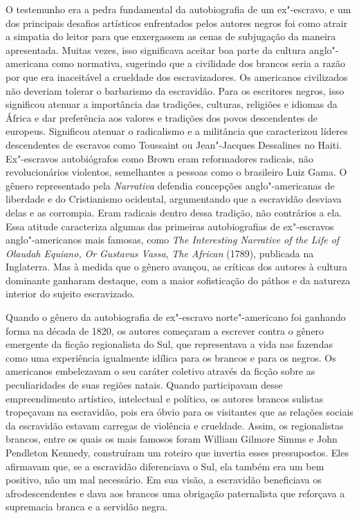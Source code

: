 O testemunho era a pedra fundamental da autobiografia de um ex"-escravo,
e um dos principais desafios artísticos enfrentados pelos autores negros
foi como atrair a simpatia do leitor para que enxergassem as cenas de
subjugação da maneira apresentada. Muitas vezes, isso significava
aceitar boa parte da cultura anglo"-americana como normativa, sugerindo
que a civilidade dos brancos seria a razão por que era inaceitável a
crueldade dos escravizadores. Os americanos civilizados não deveriam
tolerar o barbarismo da escravidão. Para os escritores negros, isso
significou atenuar a importância das tradições, culturas, religiões e
idiomas da África e dar preferência aos valores e tradições dos povos
descendentes de europeus. Significou atenuar o radicalismo e a
militância que caracterizou líderes descendentes de escravos como
Toussaint ou Jean"-Jacques Dessalines no Haiti. Ex"-escravos autobiógrafos
como Brown eram reformadores radicais, não revolucionários violentos,
semelhantes a pessoas como o brasileiro Luiz Gama. O gênero representado
pela \emph{Narrativa} defendia concepções anglo"-americanas de liberdade
e do Cristianismo ocidental, argumentando que a escravidão desviava
delas e as corrompia. Eram radicais dentro dessa tradição, não
contrários a ela. Essa atitude caracteriza algumas das primeiras
autobiografias de ex"-escravos anglo"-americanos mais famosas, como
\emph{The Interesting Narrative of the Life of Olaudah Equiano, Or}
\emph{Gustavus Vassa}, \emph{The African} (1789), publicada na
Inglaterra. Mas à medida que o gênero avançou, as críticas dos autores à
cultura dominante ganharam destaque, com a maior sofisticação do páthos
e da natureza interior do sujeito escravizado.

Quando o gênero da autobiografia de ex"-escravo norte"-americano foi
ganhando forma na década de 1820, os autores começaram a escrever contra
o gênero emergente da ficção regionalista do Sul, que representava a
vida nas fazendas como uma experiência igualmente idílica para os
brancos e para os negros. Os
americanos embelezavam o seu caráter coletivo através da ficção sobre as
peculiaridades de suas regiões natais. Quando participavam desse
empreendimento artístico, intelectual e político, os autores brancos
sulistas tropeçavam na escravidão, pois era óbvio para os visitantes que
as relações sociais da escravidão estavam carregas de violência e
crueldade. Assim, os regionalistas brancos, entre os quais os mais
famosos foram William Gilmore Simms e John Pendleton Kennedy,
construíram um roteiro que invertia esses pressupostos. Eles afirmavam
que, se a escravidão diferenciava o Sul, ela também era um bem positivo,
não um mal necessário. Em sua visão, a escravidão beneficiava os
afrodescendentes e dava aos brancos uma obrigação paternalista que
reforçava a supremacia branca e a servidão negra.

